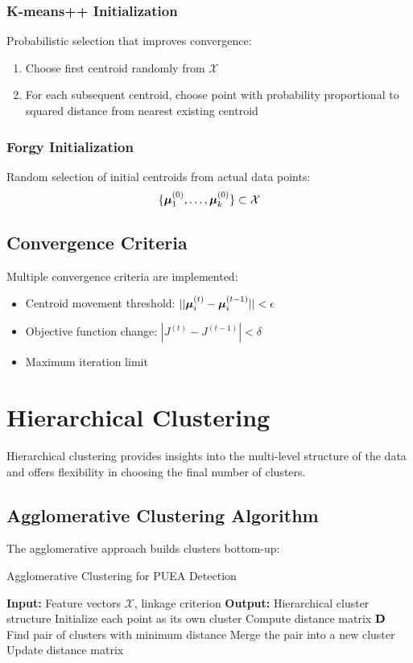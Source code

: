 \subsubsection{K-means++ Initialization}
Probabilistic selection that improves convergence:
\begin{enumerate}
\item Choose first centroid randomly from $\mathcal{X}$
\item For each subsequent centroid, choose point with probability proportional to squared distance from nearest existing centroid
\end{enumerate}

\subsubsection{Forgy Initialization}
Random selection of initial centroids from actual data points:
\begin{equation}
\{\boldsymbol{\mu}_1^{(0)}, \ldots, \boldsymbol{\mu}_k^{(0)}\} \subset \mathcal{X}
\end{equation}

\subsection{Convergence Criteria}
Multiple convergence criteria are implemented:
\begin{itemize}
\item Centroid movement threshold: $||\boldsymbol{\mu}_i^{(t)} - \boldsymbol{\mu}_i^{(t-1)}|| < \epsilon$
\item Objective function change: $|J^{(t)} - J^{(t-1)}| < \delta$
\item Maximum iteration limit
\end{itemize}

\section{Hierarchical Clustering}
Hierarchical clustering provides insights into the multi-level structure of the data and offers flexibility in choosing the final number of clusters.

\subsection{Agglomerative Clustering Algorithm}
The agglomerative approach builds clusters bottom-up:

\begin{algorithm}
\caption{Agglomerative Clustering for PUEA Detection}
\begin{algorithmic}[1]
\State \textbf{Input:} Feature vectors $\mathcal{X}$, linkage criterion
\State \textbf{Output:} Hierarchical cluster structure
\State Initialize each point as its own cluster
\State Compute distance matrix $\mathbf{D}$
    \State Find pair of clusters with minimum distance
    \State Merge the pair into a new cluster
    \State Update distance matrix
\EndWhile
\end{algorithmic}
\end{algorithm}

